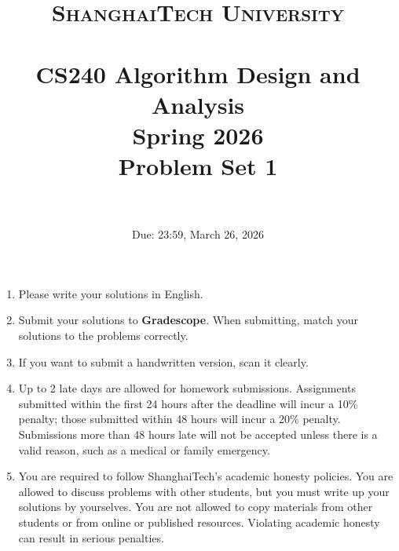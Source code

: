\documentclass{article}
\title{
    \normalfont \normalsize
    \textsc{ShanghaiTech University} \\ [25pt]
    \horrule{0.5pt} \\[0.4cm] %
    \huge CS240 Algorithm Design and Analysis \\ %
    \LARGE Spring 2026\\
    \LARGE Problem Set 1\\
    \horrule{2pt} \\[0.5cm] %
}
\author{}
\date{Due: 23:59, March 26, 2026}
\begin{document}
\maketitle
\vspace{3ex}

\begin{enumerate}
\item Please write your solutions in English. 
\item Submit your solutions to \textbf{Gradescope}. When submitting, match your solutions to the
problems correctly.
\item If you want to submit a handwritten version, scan it clearly.
\item Up to 2 late days are allowed for homework submissions. Assignments submitted within the first 24 hours after the deadline will incur a 10\% penalty; those submitted within 48 hours will incur a 20\% penalty. Submissions more than 48 hours late will not be accepted unless there is a valid reason, such as a medical or family emergency.
\item You are required to follow ShanghaiTech's academic honesty policies. You are allowed to discuss problems with other students, but you must write up your solutions by yourselves. You are not allowed to copy materials from other students or from online or published resources. Violating academic honesty can result in serious penalties.  
\end{enumerate}

\newpage


% 

% 

% 

% 

% 

% 
\end{document}
